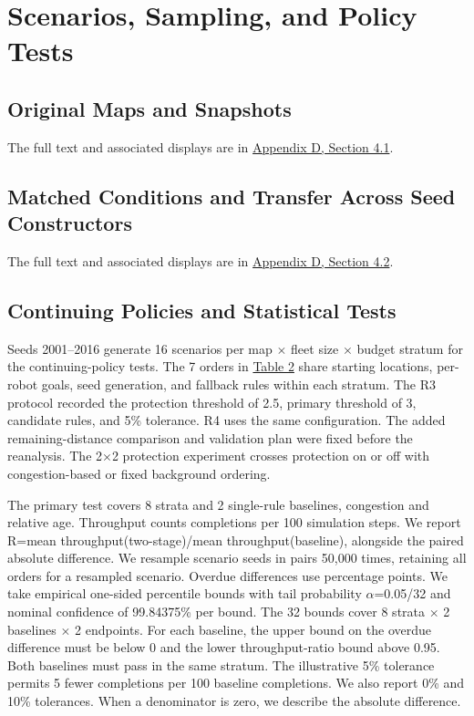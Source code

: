 \documentclass{article}
\begin{document}
\section{Scenarios, Sampling, and Policy Tests}
\subsection{Original Maps and Snapshots}
The full text and associated displays are in \hyperlink{sup:4.1}{Appendix D, Section 4.1}.

\subsection{Matched Conditions and Transfer Across Seed Constructors}
The full text and associated displays are in \hyperlink{sup:4.2}{Appendix D, Section 4.2}.

\subsection{Continuing Policies and Statistical Tests}
Seeds 2001--2016 generate 16 scenarios per map \ensuremath{\times} fleet size \ensuremath{\times} budget stratum for the continuing-policy tests. The 7 orders in \hyperlink{display:Table2}{Table 2} share starting locations, per-robot goals, seed generation, and fallback rules within each stratum. The R3 protocol recorded the protection threshold of 2.5, primary threshold of 3, candidate rules, and 5\% tolerance. R4 uses the same configuration. The added remaining-distance comparison and validation plan were fixed before the reanalysis. The 2\ensuremath{\times}2 protection experiment crosses protection on or off with congestion-based or fixed background ordering.

The primary test covers 8 strata and 2 single-rule baselines, congestion and relative age. Throughput counts completions per 100 simulation steps. We report R=mean throughput(two-stage)/mean throughput(baseline), alongside the paired absolute difference. We resample scenario seeds in pairs 50,000 times, retaining all orders for a resampled scenario. Overdue differences use percentage points. We take empirical one-sided percentile bounds with tail probability \ensuremath{\alpha}=0.05/32 and nominal confidence of 99.84375\% per bound. The 32 bounds cover 8 strata \ensuremath{\times} 2 baselines \ensuremath{\times} 2 endpoints. For each baseline, the upper bound on the overdue difference must be below 0 and the lower throughput-ratio bound above 0.95. Both baselines must pass in the same stratum. The illustrative 5\% tolerance permits 5 fewer completions per 100 baseline completions. We also report 0\% and 10\% tolerances. When a denominator is zero, we describe the absolute difference.
\end{document}
